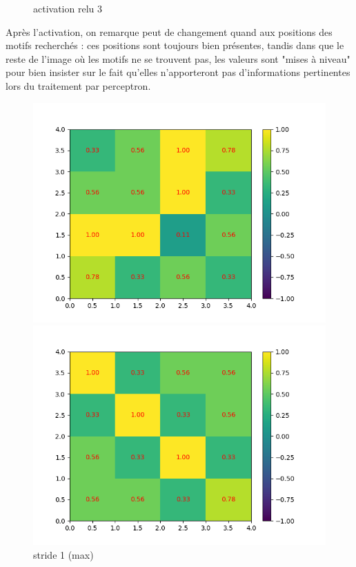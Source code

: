 \begin{figure}[h]
        \caption{activation relu 3}
    \endminipage
\end{figure}

Après l'activation, on remarque peut de changement quand aux positions des motifs recherchés : 
ces positions sont toujours bien présentes, tandis dans que le reste de l'image où les motifs ne se trouvent pas, 
les valeurs sont "mises à niveau" pour bien insister sur le fait qu'elles n'apporteront pas d'informations pertinentes 
lors du traitement par perceptron.

\begin{figure}[h]
        \includegraphics[width=\textwidth]{img/cnn_exemple/cross/stride_1_max.png}
        \caption{stride 1 (max)}
    \endminipage\hfill
        \includegraphics[width=\textwidth]{img/cnn_exemple/cross/stride_2_max.png}

\end{figure}
